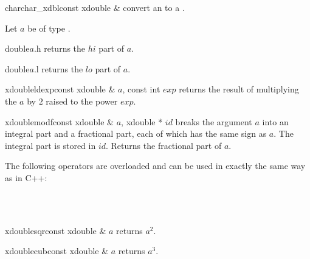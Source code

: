 \begin{fcode}{char}{char_xdbl}{const xdouble &}
  convert an  to a .
\end{fcode}



\ACCS

Let $a$ be of type .

\begin{fcode}{double}{$a$.h}{}
  returns the $\mathit{hi}$ part of $a$.
\end{fcode}

\begin{fcode}{double}{$a$.l}{}
  returns the $\mathit{lo}$ part of $a$.
\end{fcode}

\begin{fcode}{xdouble}{ldexp}{const xdouble & $a$, const int $\mathit{exp}$}
  returns the result of multiplying the $a$ by $2$ raised to the power $\mathit{exp}$.
\end{fcode}

\begin{fcode}{xdouble}{modf}{const xdouble & $a$, xdouble * $\mathit{id}$}
  breaks the argument $a$ into an integral part and a fractional part, each of which has the
  same sign as $a$.  The integral part is stored in $\mathit{id}$.  Returns the fractional part
  of $a$.
\end{fcode}




\ARTH

The following operators are overloaded and can be used in exactly the same way as in C++:

\begin{center}
  \\
  \\
\end{center}

\begin{fcode}{xdouble}{sqr}{const xdouble & $a$}
  returns $a^2$.
\end{fcode}

\begin{fcode}{xdouble}{cub}{const xdouble & $a$}
  returns $a^3$.
\end{fcode}

